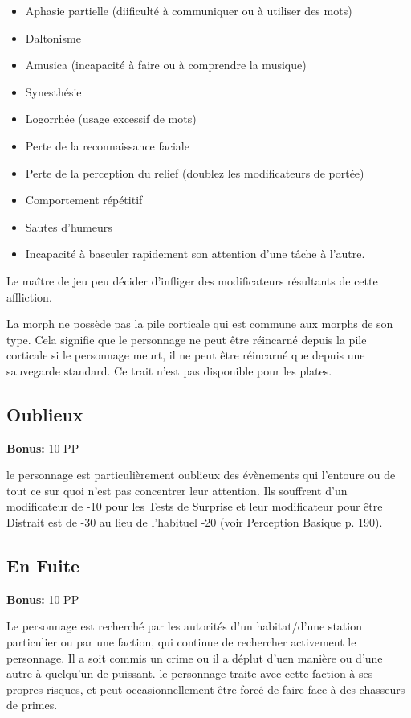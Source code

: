 \begin{itemize} \item Aphasie partielle (diificulté à communiquer ou à utiliser des mots) \item Daltonisme \item Amusica (incapacité à faire ou à comprendre la musique) \item Synesthésie \item Logorrhée (usage excessif de mots) \item Perte de la reconnaissance faciale \item Perte de la perception du relief (doublez les modificateurs de portée) \item Comportement répétitif \item Sautes d'humeurs \item Incapacité à basculer rapidement son attention d'une tâche à l'autre. \end{itemize} 

Le maître de jeu peu décider d'infliger des modificateurs résultants de cette affliction. 





La morph ne possède pas la pile corticale qui est commune aux morphs de son type. Cela signifie que le personnage ne peut être réincarné depuis la pile corticale si le personnage meurt, il ne peut être réincarné que depuis une sauvegarde standard. Ce trait n'est pas disponible pour les plates. 

\subsection{Oublieux} \label{sec:traits-oblivious} 

\textbf{Bonus:} 10 PP 

le personnage est particulièrement oublieux des évènements qui l'entoure ou de tout ce sur quoi n'est pas concentrer leur attention. Ils souffrent d'un modificateur de -10 pour les Tests de Surprise et leur modificateur pour être Distrait est de -30 au lieu de l'habituel -20 (voir Perception Basique p. 190). 

\subsection{En Fuite} \label{sec:traits-on-the-run} 

\textbf{Bonus:} 10 PP 

Le personnage est recherché par les autorités d'un habitat/d'une station particulier ou par une faction, qui continue de rechercher activement le personnage. Il a soit commis un crime ou il a déplut d'uen manière ou d'une autre à quelqu'un de puissant. le personnage traite avec cette faction à ses propres risques, et peut occasionnellement être forcé de faire face à des chasseurs de primes. 

